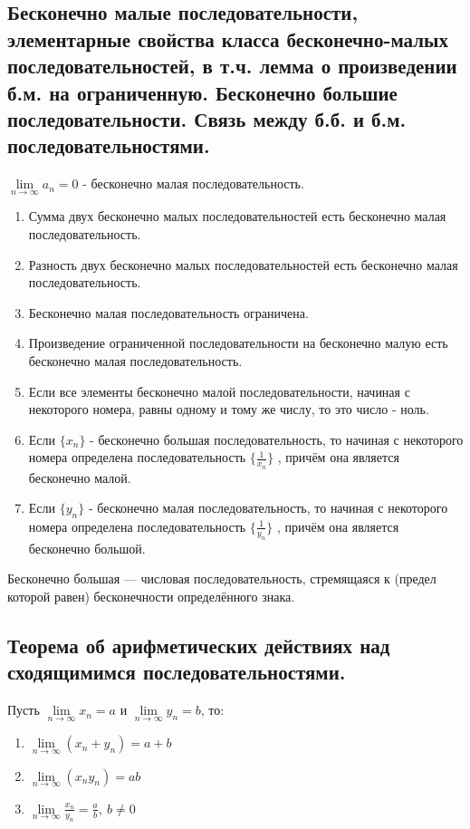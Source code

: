 \documentclass{article}
\begin{document}
\subsection{Бесконечно малые последовательности, элементарные свойства класса бесконечно-малых последовательностей, в т.ч. лемма о произведении б.м. на ограниченную. Бесконечно большие последовательности. Связь между б.б. и б.м. последовательностями.}
 $\lim\limits_{n \to \infty}a_n = 0$ - бесконечно малая последовательность.

\begin{enumerate}
	\item Сумма двух бесконечно малых последовательностей есть бесконечно малая последовательность.
	\item Разность двух бесконечно малых последовательностей есть бесконечно малая последовательность.
	\item Бесконечно малая последовательность ограничена.
	\item Произведение ограниченной последовательности на бесконечно малую есть бесконечно малая последовательность.
	\item Если все элементы бесконечно малой последовательности, начиная с некоторого номера, равны одному и тому же числу, то это число - ноль.
	\item Если $\{x_{n}\}$ - бесконечно большая последовательность, то начиная с некоторого номера определена последовательность $\{\frac{1}{x_{n}}\}$ , причём она является бесконечно малой.
	\item Если $\{y_{n}\}$ - бесконечно малая последовательность, то начиная с некоторого номера определена последовательность $\{\frac{1}{y_{n}}\}$ , причём она является бесконечно большой.
\end{enumerate}

 Бесконечно большая — числовая последовательность, стремящаяся к (предел которой равен) бесконечности определённого знака.

\subsection{Теорема об арифметических действиях над сходящимимся последовательностями.}

 Пусть $\lim\limits_{n \to \infty}x_n = a$ и $\lim\limits_{n \to \infty}y_n = b$, то:
\begin{enumerate}
	\item $\lim\limits_{n \to \infty}(x_n + y_n) = a + b$
	\item $\lim\limits_{n \to \infty}(x_ny_n) = ab$
	\item $\lim\limits_{n \to \infty}\frac{x_n}{y_n} = \frac{a}{b},\ b \neq 0$
\end{enumerate}
\end{document}
